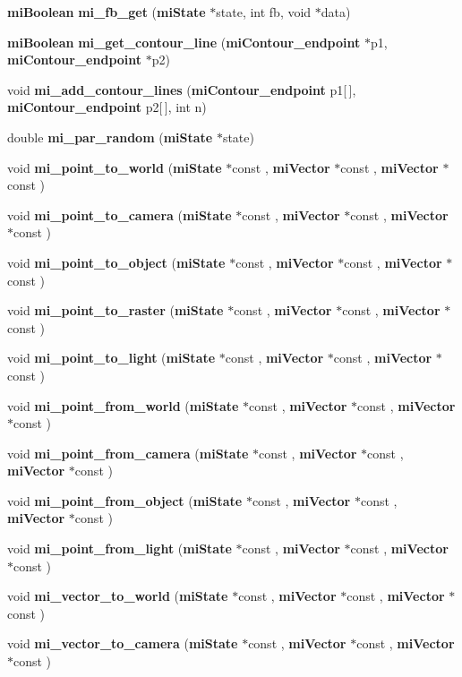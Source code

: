 \begin{CompactItemize}
\item 
{\bf mi\-Boolean} {\bf mi\_\-fb\_\-get} ({\bf mi\-State} $\ast$state, int fb, void $\ast$data)
\item 
{\bf mi\-Boolean} {\bf mi\_\-get\_\-contour\_\-line} ({\bf mi\-Contour\_\-endpoint} $\ast$p1, {\bf mi\-Contour\_\-endpoint} $\ast$p2)
\item 
void {\bf mi\_\-add\_\-contour\_\-lines} ({\bf mi\-Contour\_\-endpoint} p1[$\,$], {\bf mi\-Contour\_\-endpoint} p2[$\,$], int n)
\item 
double {\bf mi\_\-par\_\-random} ({\bf mi\-State} $\ast$state)
\item 
void {\bf mi\_\-point\_\-to\_\-world} ({\bf mi\-State} $\ast$const , {\bf mi\-Vector} $\ast$const , {\bf mi\-Vector} $\ast$const )
\item 
void {\bf mi\_\-point\_\-to\_\-camera} ({\bf mi\-State} $\ast$const , {\bf mi\-Vector} $\ast$const , {\bf mi\-Vector} $\ast$const )
\item 
void {\bf mi\_\-point\_\-to\_\-object} ({\bf mi\-State} $\ast$const , {\bf mi\-Vector} $\ast$const , {\bf mi\-Vector} $\ast$const )
\item 
void {\bf mi\_\-point\_\-to\_\-raster} ({\bf mi\-State} $\ast$const , {\bf mi\-Vector} $\ast$const , {\bf mi\-Vector} $\ast$const )
\item 
void {\bf mi\_\-point\_\-to\_\-light} ({\bf mi\-State} $\ast$const , {\bf mi\-Vector} $\ast$const , {\bf mi\-Vector} $\ast$const )
\item 
void {\bf mi\_\-point\_\-from\_\-world} ({\bf mi\-State} $\ast$const , {\bf mi\-Vector} $\ast$const , {\bf mi\-Vector} $\ast$const )
\item 
void {\bf mi\_\-point\_\-from\_\-camera} ({\bf mi\-State} $\ast$const , {\bf mi\-Vector} $\ast$const , {\bf mi\-Vector} $\ast$const )
\item 
void {\bf mi\_\-point\_\-from\_\-object} ({\bf mi\-State} $\ast$const , {\bf mi\-Vector} $\ast$const , {\bf mi\-Vector} $\ast$const )
\item 
void {\bf mi\_\-point\_\-from\_\-light} ({\bf mi\-State} $\ast$const , {\bf mi\-Vector} $\ast$const , {\bf mi\-Vector} $\ast$const )
\item 
void {\bf mi\_\-vector\_\-to\_\-world} ({\bf mi\-State} $\ast$const , {\bf mi\-Vector} $\ast$const , {\bf mi\-Vector} $\ast$const )
\item 
void {\bf mi\_\-vector\_\-to\_\-camera} ({\bf mi\-State} $\ast$const , {\bf mi\-Vector} $\ast$const , {\bf mi\-Vector} $\ast$const )
\item 

\end{CompactItemize}
